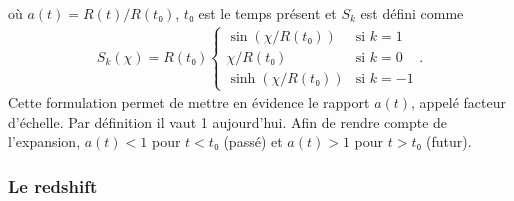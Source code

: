 \documentclass[11pt, twoside, a4paper, openright]{report}
\begin{document}
où $a(t) = R(t) / R(t₀)$,  $t₀$ est le temps présent et $S_{k}$ est défini comme
\begin{align}
  S_{k}(\chi) = R(t₀) \left\{
    \begin{array}{ll}
      \sin(\chi / R(t₀)) & \mbox{si } k = 1 \\
      \chi / R(t₀) & \textrm{si } k = 0 \\
      \sinh(\chi / R(t₀)) & \mbox{si } k = -1
    \end{array}
\right..
\end{align}
Cette formulation permet de mettre en évidence le rapport $a(t)$, appelé facteur d'échelle. Par définition il vaut 1 aujourd'hui. Afin de rendre compte de l'expansion, $a(t) < 1$ pour $t < t₀$ (passé) et $a(t) > 1$ pour $t > t₀$ (futur).

\subsubsection{Le redshift}
\label{par:redshift}
\end{document}
